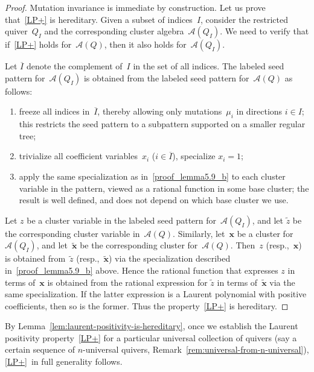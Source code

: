\begin{proof}
Mutation invariance is immediate by construction. Let us prove that~\ref{LP+} is hereditary. Given a subset of indices~$I$, consider the restricted quiver~$Q_I$ and the corresponding cluster algebra~$\mathcal{A}(Q_I)$. We need to verify that if~\ref{LP+} holds for~$\mathcal{A}(Q)$, then it also holds for~$\mathcal{A}(Q_I)$. 

Let $\overline I$ denote the complement of~$I$ in the set of all indices. The labeled seed pattern for~$\mathcal{A}(Q_I)$ is obtained from the labeled seed pattern for~$\mathcal{A}(Q)$ as follows: 
\begin{enumerate}[label=(\alph*)]
\item\label{proof_lemma5.9_a} %
freeze all indices in~$\overline I$, thereby allowing only mutations~$\mu_i$ in directions $i\in I$; this restricts the seed pattern to a subpattern supported on a smaller regular tree; 
\item\label{proof_lemma5.9_b} %
trivialize all coefficient variables~$x_i$ ($i\in\overline I$), \ie specialize $x_i=1$;
\item\label{proof_lemma5.9_c} %
apply the same specialization as in~\ref{proof_lemma5.9_b} to each cluster variable in the pattern, viewed as a rational function in some base cluster; the result is well defined, and does not depend on which base cluster we use. 
\end{enumerate}
Let $z$ be a cluster variable in the labeled seed pattern for~$\mathcal{A}(Q_I)$, and let $\tilde z$ be the corresponding cluster variable in~$\mathcal{A}(Q)$. Similarly, let~$\mathbf{x}$ be a cluster for~$\mathcal{A}(Q_I)$, and let~$\mathbf{\tilde x}$ be the corresponding cluster for~$\mathcal{A}(Q)$. 
Then~$z$ (resp.,~$\mathbf{x}$) is obtained from~$\tilde z$ (resp.,~$\mathbf{\tilde x}$) via the specialization described in~\ref{proof_lemma5.9_b} above. 
Hence the rational function that expresses $z$ in terms of~$\mathbf{x}$ is obtained from the rational expression for $\tilde z$ in terms of~$\mathbf{\tilde x}$ via the same specialization. If the latter expression is a Laurent polynomial with positive coefficients, then so is the former. Thus the property~\ref{LP+} is hereditary. 
\end{proof}

\begin{observation}
{%
By Lemma~\ref{lem:laurent-positivity-is-hereditary}, once we establish the Laurent positivity property~\ref{LP+} for a particular universal collection of quivers (say a certain sequence of $n$-universal quivers, \cf Remark~\ref{rem:universal-from-n-universal}), \ref{LP+}~in full generality follows. 
}
\end{observation}

